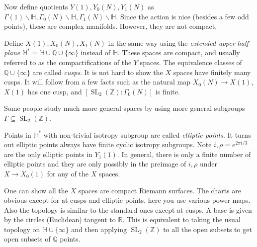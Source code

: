 \documentclass[11pt]{article}
\newcommand{\BB}[1]{\mathbb{#1}} %
\newcommand{\RR}{\BB{R}}
\newcommand{\QQ}{\BB{Q}}
\newcommand{\ZZ}{\BB{Z}}
\newcommand{\HH}{\BB{H}}
\newcommand{\st}{\colon}
\newcommand{\SL}{\operatorname{SL}}
\theoremstyle{plain}
\theoremstyle{remark}
\begin{document}
Now define quotients $Y(1),Y_0(N),Y_1(N)$ as $\Gamma(1)\backslash\HH,\Gamma_0(N)\backslash\HH,\Gamma_1(N)\backslash\HH$. Since the action is nice (besides a few odd points), these are complex manifolds. However, they are not compact.

Define $X(1),X_0(N),X_1(N)$ in the same way using the \emph{extended upper half plane} $\HH^* = \HH\cup\QQ\cup\{\infty\}$ instead of $\HH$. These spaces are compact, and usually referred to as the compactifications of the $Y$ spaces. The equivalence classes of $\QQ\cup\{\infty\}$ are called \emph{cusps}. It is not hard to show the $X$ spaces have finitely many cusps. It will follow from a few facts such as the natural map $X_0(N) \to X(1)$, $X(1)$ has one cusp, and $[\SL_2(\ZZ)\st\Gamma_0(N)]$ is finite.

\begin{note}
	Some people study much more general spaces by using more general subgroups $\Gamma\subseteq\SL_2(\ZZ)$.
\end{note}

\begin{note}
	Points in $\HH^*$ with non-trivial isotropy subgroup are called \emph{elliptic points}. It turns out elliptic points always have finite cyclic isotropy subgroups. Note $i,\rho = e^{2\pi i/3}$ are the only elliptic points in $Y_1(1)$. In general, there is only a finite number of elliptic points and they are only possibly in the preimage of $i,\rho$ under $X \to X_0(1)$ for any of the $X$ spaces.
\end{note}

One can show all the $X$ spaces are compact Riemann surfaces. The charts are obvious except for at cusps and elliptic points, here you use various power maps. Also the topology is similar to the standard ones except at cusps. A base is given by the circles (Euclidean) tangent to $\RR$. This is equivalent to taking the usual topology on $\HH\cup\{\infty\}$ and then applying $\SL_2(\ZZ)$ to all the open subsets to get open subsets of $\QQ$ points.
\end{document}
